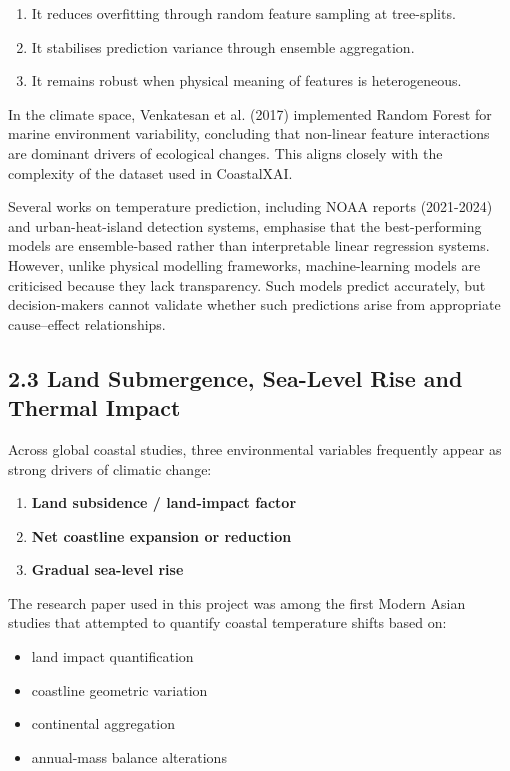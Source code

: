 \documentclass[12pt, a4paper]{article}
\begin{document}
\begin{enumerate}
    \item It reduces overfitting through random feature sampling at tree-splits.
    \item It stabilises prediction variance through ensemble aggregation.
    \item It remains robust when physical meaning of features is heterogeneous.
\end{enumerate}

In the climate space, Venkatesan et al. (2017) \cite{venk2017} implemented Random Forest for marine environment variability, concluding that non-linear feature interactions are dominant drivers of ecological changes. This aligns closely with the complexity of the dataset used in CoastalXAI.

Several works on temperature prediction, including NOAA reports (2021-2024) and urban-heat-island detection systems, emphasise that the best-performing models are ensemble-based rather than interpretable linear regression systems. However, unlike physical modelling frameworks, machine-learning models are criticised because they lack transparency. Such models predict accurately, but decision-makers cannot validate whether such predictions arise from appropriate cause–effect relationships.

\subsection{\textbf{2.3 Land Submergence, Sea-Level Rise and Thermal Impact}}

Across global coastal studies, three environmental variables frequently appear as strong drivers of climatic change:

\begin{enumerate}
    \item \textbf{Land subsidence / land-impact factor}
    \item \textbf{Net coastline expansion or reduction}
    \item \textbf{Gradual sea-level rise}
\end{enumerate}

The research paper used in this project \cite{wang2024} was among the first Modern Asian studies that attempted to quantify coastal temperature shifts based on:

\begin{itemize}
    \item land impact quantification
    \item coastline geometric variation
    \item continental aggregation
    \item annual-mass balance alterations
\end{itemize}
\end{document}
